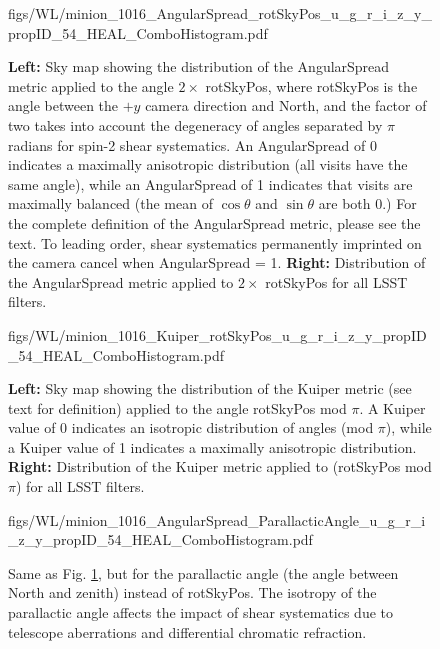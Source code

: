 \begin{figure}[tbh!]
        {figs/WL/minion_1016_AngularSpread_rotSkyPos_u_g_r_i_z_y_propID_54_HEAL_ComboHistogram.pdf}
\caption{\textbf{Left:} Sky map showing the distribution of the AngularSpread
    metric applied to the angle $2 \times$ rotSkyPos, where rotSkyPos is the
    angle between the $+y$ camera direction and North, and the factor of two
    takes into account the degeneracy of angles separated by $\pi$ radians for
    spin-2 shear systematics.  An AngularSpread of 0 indicates a maximally
    anisotropic distribution (all visits have the same angle), while an
    AngularSpread of 1 indicates that visits are maximally balanced (the mean of
    $\cos \theta$ and $\sin \theta$ are both 0.) For the complete definition of
    the AngularSpread metric, please see the text.  To leading order, shear
    systematics permanently imprinted on the camera cancel when AngularSpread =
    1.  \textbf{Right:} Distribution of the AngularSpread metric applied to
    $2 \times$ rotSkyPos for all LSST filters.}
\label{fig:WL_AngularSpread_rotSkyPos}
\end{figure}

\begin{figure}[tbh!]
        {figs/WL/minion_1016_Kuiper_rotSkyPos_u_g_r_i_z_y_propID_54_HEAL_ComboHistogram.pdf}
\caption{\textbf{Left:} Sky map showing the distribution of the Kuiper metric
    (see text for definition) applied to the angle rotSkyPos mod $\pi$.  A
    Kuiper value of 0 indicates an isotropic distribution of angles (mod $\pi$),
    while a Kuiper value of 1 indicates a maximally anisotropic distribution.
    \textbf{Right:} Distribution of the Kuiper metric applied to (rotSkyPos mod
    $\pi$) for all LSST filters.}
\label{fig:WL_Kuiper_rotSkyPos}
\end{figure}


\begin{figure}[tbh!]
        {figs/WL/minion_1016_AngularSpread_ParallacticAngle_u_g_r_i_z_y_propID_54_HEAL_ComboHistogram.pdf}
\caption{Same as Fig. \ref{fig:WL_AngularSpread_rotSkyPos}, but for the
    parallactic angle (the angle between North and zenith) instead of rotSkyPos.
    The isotropy of the parallactic angle affects the impact of shear
    systematics due to telescope aberrations and differential chromatic
    refraction.}
\label{fig:WL_AngularSpread_ParallacticAngle}
\end{figure}

